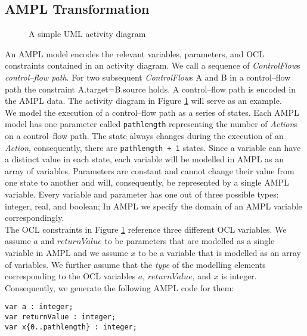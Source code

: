 \documentclass[runningheads,a4paper]{llncs}%
\newcommand{\UMLType}[1]{\textsf{\textit{#1}}} %
\newcommand{\UMLReference}[1]{\textsf{\textit{#1}}} %
\newcommand{\AMPLCode}[1]{\texttt{#1}}
\begin{document}
\subsection{AMPL Transformation}%
\label{sec:AMPLTransformation}%
\begin{figure}%
\def\svgwidth{\textwidth}%
\graphicspath{{./pics/}}%
%
\caption{A simple UML activity diagram}%
\label{fig:AssignmentDecision}%
\end{figure}%
An AMPL model encodes the relevant variables, parameters, and OCL constraints contained in an activity diagram. We call a sequence of \UMLReference{ControlFlow}s \emph{control--flow path}. For two subsequent \UMLType{ControlFlow}s A and B in a control--flow path the constraint A.target=B.source holds. A control--flow path is encoded in the AMPL data. The activity diagram in Figure \ref{fig:AssignmentDecision} will serve as an example.\\%
We model the execution of a control--flow path as a series of states. Each AMPL model has one parameter called \AMPLCode{pathlength} representing the number of \UMLType{Action}s on a control--flow path. The state always changes during the execution of an \UMLType{Action}, consequently, there are \AMPLCode{pathlength + 1} states. Since a variable can have a distinct value in each state, each variable will be modelled in AMPL as an array of variables. Parameters are constant and cannot change their value from one state to another and will, consequently, be represented by a single AMPL variable. Every variable and parameter has one out of three possible types: integer, real, and boolean; In AMPL we specify the domain of an AMPL variable correspondingly.\\%
The OCL constraints in Figure \ref{fig:AssignmentDecision} reference three different OCL variables. We assume $a$ and $returnValue$ to be parameters that are modelled as a single variable in AMPL and we assume $x$ to be a variable that is modelled as an array of variables. We further assume that the \UMLReference{type} of the modelling elements corresponding to the OCL variables $a$, ${returnValue}$, and $x$ is integer. Consequently, we generate the following AMPL code for them: %
\begin{lstlisting}[basicstyle=\ttfamily,language=ampl]
var a : integer;
var returnValue : integer;
var x{0..pathlength} : integer;
\end{lstlisting}%
\end{document}
